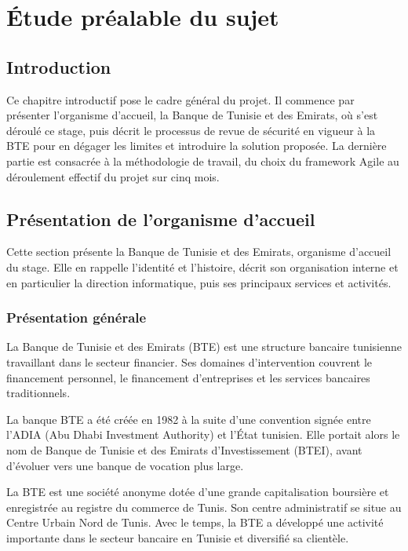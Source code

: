 \chapter{Étude préalable du sujet}

\section*{Introduction}

Ce chapitre introductif pose le cadre général du projet. Il commence par présenter
l'organisme d'accueil, la Banque de Tunisie et des Emirats, où s'est déroulé ce stage,
puis décrit le processus de revue de sécurité en vigueur à la BTE pour en dégager les
limites et introduire la solution proposée. La dernière partie est consacrée à la
méthodologie de travail, du choix du framework Agile au déroulement effectif du projet
sur cinq mois.

\section{Présentation de l'organisme d'accueil}

    Cette section présente la Banque de Tunisie et des Emirats, organisme d'accueil du
    stage. Elle en rappelle l'identité et l'histoire, décrit son organisation interne et
    en particulier la direction informatique, puis ses principaux services et activités.

    \subsection{Présentation générale}

        La Banque de Tunisie et des Emirats (BTE) \cite{BTE} est une structure bancaire
        tunisienne travaillant dans le secteur financier. Ses domaines d'intervention
        couvrent le financement personnel, le financement d'entreprises et les services
        bancaires traditionnels.

        La banque BTE a été créée en 1982 à la suite d'une convention signée entre
        l'ADIA (Abu Dhabi Investment Authority) et l'État tunisien. Elle portait alors
        le nom de Banque de Tunisie et des Emirats d'Investissement (BTEI), avant
        d'évoluer vers une banque de vocation plus large.

        La BTE est une société anonyme dotée d'une grande capitalisation boursière et
        enregistrée au registre du commerce de Tunis. Son centre administratif se situe
        au Centre Urbain Nord de Tunis. Avec le temps, la BTE a développé une activité
        importante dans le secteur bancaire en Tunisie et diversifié sa clientèle.


